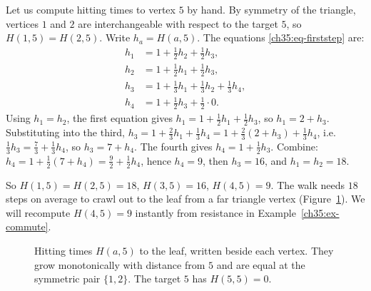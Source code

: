 \begin{example}\label{ch35:ex-hitting}
Let us compute hitting times to vertex $5$ by hand. By symmetry of the triangle, vertices $1$ and $2$ are interchangeable with respect to the target $5$, so $H(1,5)=H(2,5)$. Write $h_a=H(a,5)$. The equations \eqref{ch35:eq-firststep} are:
\begin{align*}
  h_1 &= 1+\tfrac12 h_2+\tfrac12 h_3,\\
  h_2 &= 1+\tfrac12 h_1+\tfrac12 h_3,\\
  h_3 &= 1+\tfrac13 h_1+\tfrac13 h_2+\tfrac13 h_4,\\
  h_4 &= 1+\tfrac12 h_3+\tfrac12\cdot 0.
\end{align*}
Using $h_1=h_2$, the first equation gives $h_1=1+\tfrac12 h_1+\tfrac12 h_3$, so $h_1=2+h_3$. Substituting into the third, $h_3=1+\tfrac23 h_1+\tfrac13 h_4=1+\tfrac23(2+h_3)+\tfrac13 h_4$, i.e. $\tfrac13 h_3=\tfrac73+\tfrac13 h_4$, so $h_3=7+h_4$. The fourth gives $h_4=1+\tfrac12 h_3$. Combine: $h_4=1+\tfrac12(7+h_4)=\tfrac92+\tfrac12 h_4$, hence $h_4=9$, then $h_3=16$, and $h_1=h_2=18$.

So $H(1,5)=H(2,5)=18$, $H(3,5)=16$, $H(4,5)=9$. The walk needs $18$ steps on average to crawl out to the leaf from a far triangle vertex (Figure~\ref{ch35:fig-hitting}). We will recompute $H(4,5)=9$ instantly from resistance in Example~\ref{ch35:ex-commute}.

\begin{figure}[H]
\centering
{}
\caption{Hitting times $H(a,5)$ to the leaf, written beside each vertex. They grow monotonically with distance from $5$ and are equal at the symmetric pair $\{1,2\}$. The target $5$ has $H(5,5)=0$.}
\label{ch35:fig-hitting}
\end{figure}
\end{example}

